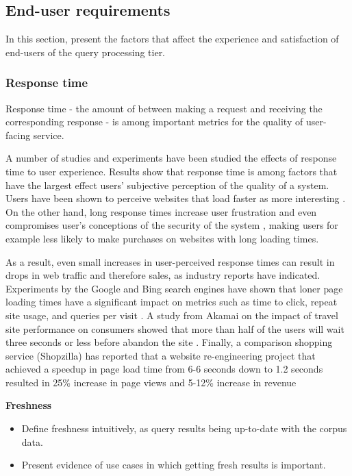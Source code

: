 \subsection{End-user requirements}
In this section, present the factors that affect the experience and satisfaction of end-users of the query processing
tier.

\subsubsection{Response time}
Response time - the amount of between making a request and receiving the corresponding response -
is among important metrics for the quality of user-facing service.

A number of studies and experiments have been studied the effects of response time to user experience.
Results show that response time is among factors that have the largest effect users' subjective perception of the
quality of a system.
Users have been shown to perceive websites that load faster as more interesting \cite{ramsay/retrievaltimesinvestigation}.
On the other hand, long response times increase user frustration \cite{ceaparu:userfrustration} and even compromises
user's conceptions of the security of the system \cite{bouch:qualityeyebeholder}, making users for example less likely to
make purchases on websites with long loading times.

As a result, even small increases in user-perceived response times can result in drops in web traffic and
therefore sales, as industry reports have indicated.
Experiments by the Google and Bing search engines have shown that loner page loading times have a significant impact on
metrics such as time to click, repeat site usage, and queries per visit \cite{schurman:rerformanceuserimpact}.
A study from Akamai on the impact of travel site performance on consumers showed that more than half of the users will
wait three seconds or less before abandon the site \cite{akamai:travelsiteperformance}.
Finally, a comparison shopping service (Shopzilla) has reported that a website re-engineering project that achieved a
speedup in page load time from 6-6 seconds down to 1.2 seconds resulted in 25\% increase in page views and 5-12\%
increase in revenue \cite{dixon:shopzillasiteredo}

\textbf{Freshness}
\begin{itemize}
  \item Define freshness intuitively, as query results being up-to-date with the corpus data.
  \item Present evidence of use cases in which getting fresh results is important.
\end{itemize}

